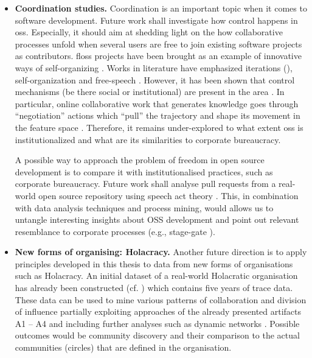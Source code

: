 \begin{itemize}
	\item{\bfseries Coordination studies.}
	Coordination is an important topic when it comes to software development. Future work shall investigate how control happens in \gls{oss}. Especially, it should aim at shedding light on the how collaborative processes unfold when several users are free to join existing software projects as contributors. \Gls{floss} projects have been brought as an example of innovative ways of self-organizing \citep{DBLP:journals/mansci/KroghH06,DBLP:journals/misq/HowisonC14}. Works in literature have emphasized iterations (\citealp{Berente2005,Berente2007}), self-organization \citep{DBLP:journals/infsof/CrowstonLWEH07,DBLP:journals/jss/HodaM16} and free-speech \citep{DBLP:conf/chiir/ThomasCMCM18,Gibson2019}. However, it has been shown that control mechanisms (be there social or institutional) are present in the area \citep{Lindberg2016}. In particular, online collaborative work that generates knowledge goes through ``negotiation'' actions which ``pull'' the trajectory and shape its movement in the feature space \citep{Arazy2020}. Therefore, it remains under-explored to what extent \gls{oss} is institutionalized and what are its similarities to corporate bureaucracy.
	
	A possible way to approach the problem of freedom in open source development is to compare it with institutionalised practices, such as corporate bureaucracy. Future work shall analyse pull requests from a real-world open source repository using speech act theory \citep{searle1985expression}. This, in combination with data analysis techniques and process mining, would allows us to untangle interesting insights about OSS development and point out relevant resemblance to corporate processes (e.g., stage-gate  \citep{cooper2008perspective}). 
	
	
	\item{\bfseries New forms of organising: Holacracy.}
	Another future direction is to apply principles developed in this thesis to data from new forms of organisations  such as Holacracy. An initial dataset of a real-world Holacratic organisation has already been constructed (cf. \cite{Wurm2021}) which contains five years of trace data. These data can be used to mine various patterns of collaboration and division of influence partially exploiting approaches of the already presented artifacts A1 – A4 and including further analyses such as dynamic networks \citep{DBLP:journals/csur/RossettiC18,DBLP:journals/corr/abs-0803-2093}. Possible outcomes would be community discovery and their comparison to the actual communities (circles) that are defined in the organisation.
	

\end{itemize}
